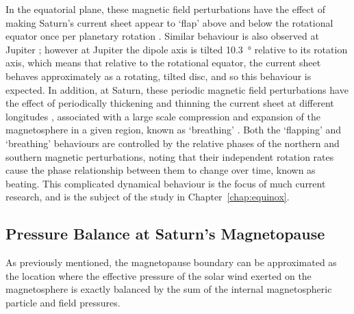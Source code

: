 In the equatorial plane, these magnetic field perturbations have the effect of making Saturn's current sheet appear to `flap' above and below the rotational equator once per planetary rotation \citep[e.g.][]{arridge2011}. Similar behaviour is also observed at Jupiter \citep[e.g.][]{khurana1989}; however at Jupiter the dipole axis is tilted \SI{10.3}{\degree} relative to its rotation axis, which means that relative to the rotational equator, the current sheet behaves approximately as a rotating, tilted disc, and so this behaviour is expected. In addition, at Saturn, these periodic magnetic field perturbations have the effect of periodically thickening and thinning the current sheet at different longitudes \citep{provan2012}, associated with a large scale compression and expansion of the magnetosphere in a given region, known as `breathing' \citep{ramer2016}. Both the `flapping' and `breathing' behaviours are controlled by the relative phases of the northern and southern magnetic perturbations, noting that their independent rotation rates cause the phase relationship between them to change over time, known as beating. This complicated dynamical behaviour is the focus of much current research, and is the subject of the study in Chapter~\ref{chap:equinox}.

\subsection{Pressure Balance at Saturn's Magnetopause}\label{intro:sec:pbalance}
As previously mentioned, the magnetopause boundary can be approximated as the location where the effective pressure of the solar wind exerted on the magnetosphere is exactly balanced by the sum of the internal magnetospheric particle and field pressures. 

